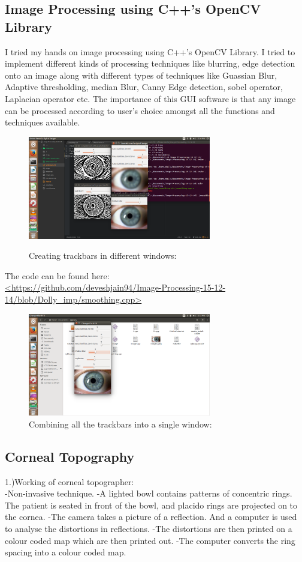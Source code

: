 \documentclass[12pt]{article}
\begin{document}
 \subsection{Image Processing using C++'s OpenCV Library}

I tried my hands on image processing using C++'s OpenCV Library. I tried to implement different kinds of processing techniques like blurring, edge detection onto an image along with different types of techniques like Guassian Blur, Adaptive thresholding, median Blur, Canny Edge detection, sobel operator, Laplacian operator etc. The importance of this GUI software is that any image can be processed according to user's choice amongst all the functions and techniques available. \\


\begin{figure}[h!]
  \caption{Creating trackbars in different windows: }
  \centering
 \includegraphics[width=8cm]{img.png}\\
 \end{figure}
The code can be found here:\\

\url{<https://github.com/deveshjain94/Image-Processing-15-12-14/blob/Dolly_imp/smoothing.cpp>}  

 \begin{figure}[h!]
  \caption{Combining all the trackbars into a single window: }
  \centering
 \includegraphics[width=8cm]{fe.png}
  \end{figure}
  
 \subsection{Corneal Topography}
1.)Working of corneal topographer: \\
-Non-invasive technique.
-A lighted bowl contains patterns of concentric rings. The patient is seated in front of the bowl, and placido rings are projected on to the cornea. 
-The camera takes a picture of a reflection. And a computer is used to analyse the distortions in reflections.
-The distortions are then printed on a colour coded map which are then printed out.
-The computer converts the ring spacing into a colour coded map. 
\end{document}
